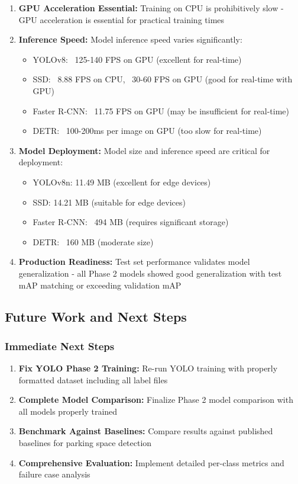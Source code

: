 \documentclass[12pt,a4paper]{article}
\begin{document}
\begin{enumerate}
    \item \textbf{GPU Acceleration Essential:} Training on CPU is prohibitively slow - GPU acceleration is essential for practical training times
    \item \textbf{Inference Speed:} Model inference speed varies significantly:
    \begin{itemize}
        \item YOLOv8: ~125-140 FPS on GPU (excellent for real-time)
        \item SSD: ~8.88 FPS on CPU, ~30-60 FPS on GPU (good for real-time with GPU)
        \item Faster R-CNN: ~11.75 FPS on GPU (may be insufficient for real-time)
        \item DETR: ~100-200ms per image on GPU (too slow for real-time)
    \end{itemize}
    \item \textbf{Model Deployment:} Model size and inference speed are critical for deployment:
    \begin{itemize}
        \item YOLOv8n: 11.49 MB (excellent for edge devices)
        \item SSD: 14.21 MB (suitable for edge devices)
        \item Faster R-CNN: ~494 MB (requires significant storage)
        \item DETR: ~160 MB (moderate size)
    \end{itemize}
    \item \textbf{Production Readiness:} Test set performance validates model generalization - all Phase 2 models showed good generalization with test mAP matching or exceeding validation mAP
\end{enumerate}

\subsection{Future Work and Next Steps}

\subsubsection{Immediate Next Steps}

\begin{enumerate}
    \item \textbf{Fix YOLO Phase 2 Training:} Re-run YOLO training with properly formatted dataset including all label files
    \item \textbf{Complete Model Comparison:} Finalize Phase 2 model comparison with all models properly trained
    \item \textbf{Benchmark Against Baselines:} Compare results against published baselines for parking space detection
    \item \textbf{Comprehensive Evaluation:} Implement detailed per-class metrics and failure case analysis
\end{enumerate}
\end{document}
